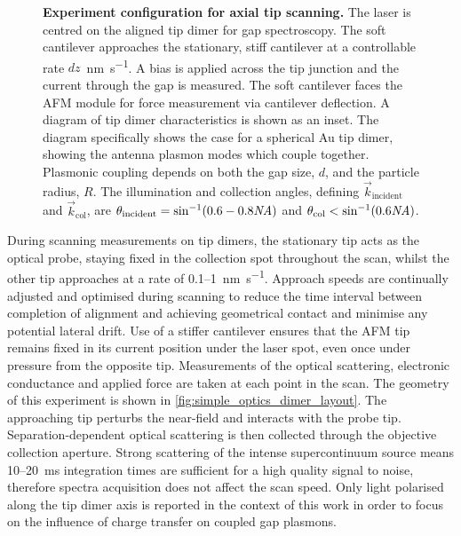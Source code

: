 \documentclass[a4paper]{article}
\begin{document}
\begin{figure}[bt]
\vspace{-10pt}
\centering
\fontsize{10pt}{1em}\selectfont
{}
\caption[Experiment configuration for axial tip scanning]{\textbf{Experiment configuration for axial tip scanning.} The laser is centred on the aligned tip dimer for gap spectroscopy. The soft cantilever approaches the stationary, stiff cantilever at a controllable rate $dz$~\si{\nano\metre\per\second}. A bias is applied across the tip junction and the current through the gap is measured. The soft cantilever faces the AFM module for force measurement via cantilever deflection.
A diagram of tip dimer characteristics is shown as an inset. The diagram specifically shows the case for a spherical Au tip dimer, showing the antenna plasmon modes which couple together. Plasmonic coupling depends on both the gap size, $d$, and the particle radius, $R$. The illumination and collection angles, defining $\vec{k}_{\mathrm{incident}}$ and $\vec{k}_{\mathrm{col}}$, are $\theta_{\mathrm{incident}} = \sin^{-1}(0.6-0.8\mathit{NA})$ and $\theta_{\mathrm{col}} < \sin^{-1}(0.6\mathit{NA})$.
}
\label{fig:simple_optics_dimer_layout}
\vspace{-5pt}
\end{figure}

During scanning measurements on tip dimers, the stationary tip acts as the optical probe, staying fixed in the collection spot throughout the scan, whilst the other tip approaches at a rate of 0.1--\SI{1}{\nano\metre\per\second}. Approach speeds are continually adjusted and optimised during scanning to reduce the time interval between completion of alignment and achieving geometrical contact and minimise any potential lateral drift. Use of a stiffer cantilever ensures that the AFM tip remains fixed in its current position under the laser spot, even once under pressure from the opposite tip. Measurements of the optical scattering, electronic conductance and applied force are taken at each point in the scan. The geometry of this experiment is shown in \autoref{fig:simple_optics_dimer_layout}.
The approaching tip perturbs the near-field and interacts with the probe tip. Separation-dependent optical scattering is then collected through the objective collection aperture. Strong scattering of the intense supercontinuum source means 10--\SI{20}{ms} integration times are sufficient for a high quality signal to noise, therefore spectra acquisition does not affect the scan speed. %
Only light polarised along the tip dimer axis is reported in the context of this work in order to focus on the influence of charge transfer on coupled gap plasmons. %
\end{document}
